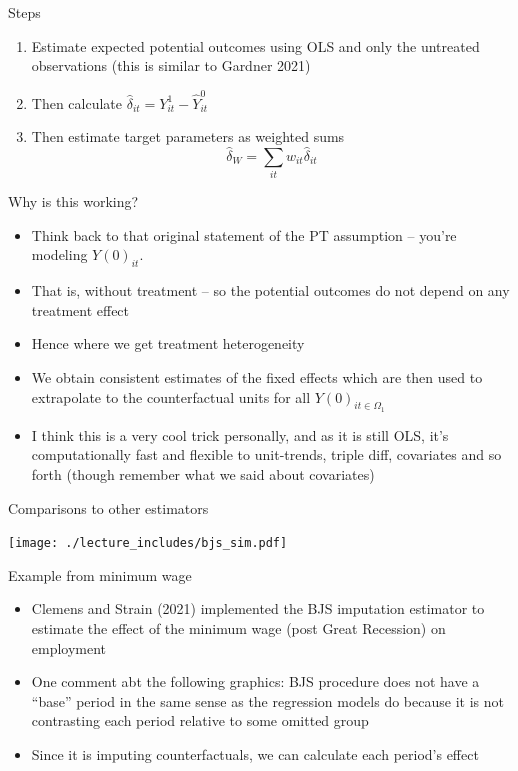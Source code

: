 \documentclass{beamer}
\begin{document}
\begin{frame}{Steps}

\begin{enumerate}
\item Estimate expected potential outcomes using OLS and only the untreated observations (this is similar to Gardner 2021)
\item Then calculate $\widehat{\delta}_{it} = Y_{it}^1 - \widehat{Y}_{it}^0$
\item Then estimate target parameters as weighted sums$$\widehat{\delta}_W = \sum_{it}w_{it}\widehat{\delta}_{it}$$
\end{enumerate}

\end{frame}


\begin{frame}{Why is this working?}

\begin{itemize}
\item Think back to that original statement of the PT assumption -- you're modeling $Y(0)_{it}$. 
\item That is, without treatment -- so the potential outcomes do not depend on any treatment effect
\item Hence where we get treatment heterogeneity
\item We obtain consistent estimates of the fixed effects which are then used to extrapolate to the counterfactual units for all $Y(0)_{it \in \Omega_1}$
\item I think this is a very cool trick personally, and as it is still OLS, it's computationally fast and flexible to unit-trends, triple diff, covariates and so forth (though remember what we said about covariates)
\end{itemize}

\end{frame}


\begin{frame}{Comparisons to other estimators}

\begin{center}
\texttt{[image: ./lecture\_includes/bjs\_sim.pdf]}
\end{center}

\end{frame}

\begin{frame}{Example from minimum wage}

\begin{itemize}
\item Clemens and Strain (2021) implemented the BJS imputation estimator to estimate the effect of the minimum wage (post Great Recession) on employment
\item One comment abt the following graphics: BJS procedure does not have a ``base'' period in the same sense as the regression models do because it is not contrasting each period relative to some omitted group
\item Since it is imputing counterfactuals, we can calculate each period's effect
\end{itemize}

\end{frame}
\end{document}
